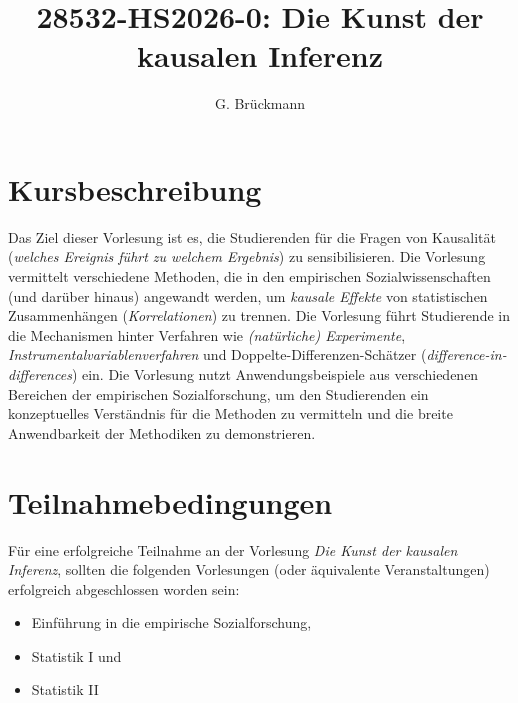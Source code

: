 \documentclass[12pt,a4paper]{article}
\begin{document}
\newcommand{\CourseNumber}{28532-HS2026-0}
\newcommand{\CourseTitle}{Die Kunst der kausalen Inferenz}
\newcommand{\CourseAcronym}{KKI2026}
\newcommand{\Institute}{Institute für Politikwissenschaft}
\newcommand{\University}{Universität Bern}
\newcommand{\Departement}{Departement Sozialwissenschaften}
\newcommand{\DateTimeCourse}{Dienstag, 14:15-15:55 Uhr}
\newcommand{\LocationCourse}{Institutsgebäude vonRoll Hörraum B 101}
\newcommand{\DateTimeOfficeHours}{Montag, 15:00-16:00 Uhr}
\newcommand{\LocationOfficeHours}{Institutsgebäude vonRoll A 169 oder Sprechstunde per \href{https://unibe-ch.zoom.us/my/graciabrueckmann}{Zoom}}
\author{G. Brückmann} %
\newcommand{\lecturertitle}{Dr.}
\newcommand{\lectureremail}{gracia.brueckmann@unibe.ch}


\title{\CourseNumber: \CourseTitle}




\maketitle






\section{Kursbeschreibung} 
Das Ziel dieser Vorlesung ist es, die Studierenden für die Fragen von Kausalität (\textit{welches Ereignis führt zu welchem Ergebnis}) zu sensibilisieren. Die Vorlesung vermittelt verschiedene Methoden, die in den empirischen Sozialwissenschaften (und darüber hinaus) angewandt werden, um \textit{kausale Effekte} von statistischen Zusammenhängen (\textit{Korrelationen}) zu trennen. Die Vorlesung führt Studierende in die Mechanismen hinter Verfahren wie \textit{(natürliche) Experimente}, \textit{Instrumentalvariablenverfahren} und Doppelte-Differenzen-Schätzer (\textit{difference-in-differences}) ein. Die Vorlesung nutzt Anwendungsbeispiele aus verschiedenen Bereichen der empirischen Sozialforschung, um den Studierenden ein konzeptuelles Verständnis für die Methoden zu vermitteln und die breite Anwendbarkeit der Methodiken zu demonstrieren.

\section{Teilnahmebedingungen}
Für eine erfolgreiche Teilnahme an der Vorlesung \textit{Die Kunst der kausalen Inferenz}, sollten die folgenden Vorlesungen (oder äquivalente Veranstaltungen) erfolgreich abgeschlossen worden sein: 
\begin{itemize}
    \item Einführung in die empirische Sozialforschung,
    \item Statistik I und 
    \item Statistik II
\end{itemize}
\end{document}
